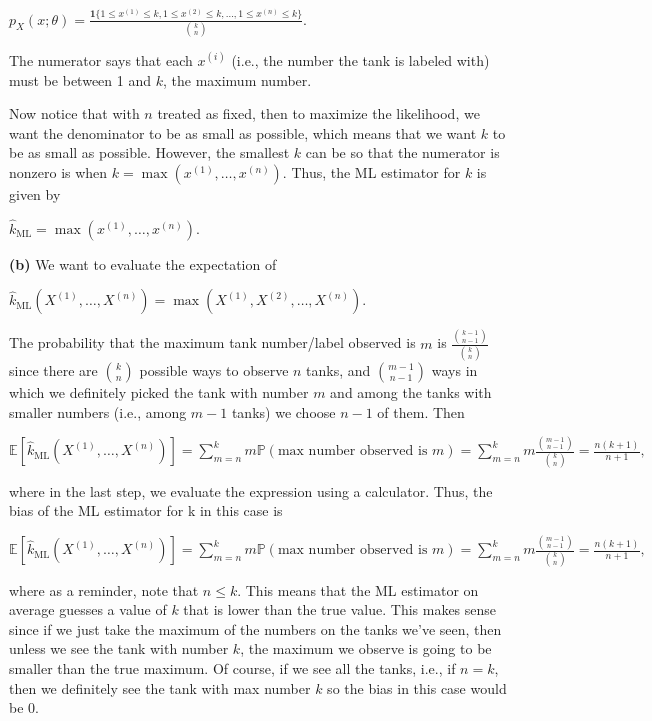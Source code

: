 \documentclass[6008notes.tex]{subfiles}
\begin{document}
{\centering$p_ X(x; \theta ) = \frac{\mathbf{1}\{ 1\le x^{(1)} \le k, 1 \le x^{(2)} \le k, \dots , 1 \le x^{(n)} \le k\} }{{k \choose n}}.$ \par}
 
The numerator says that each $x^{(i)}$ (i.e., the number the tank is labeled with) must be between 1 and $k$, the maximum number.

Now notice that with $n$ treated as fixed, then to maximize the likelihood, we want the denominator to be as small as possible, which means that we want $k$ to be as small as possible. However, the smallest $k$ can be so that the numerator is nonzero is when $k = \max (x^{(1)}, \dots , x^{(n)})$. Thus, the ML estimator for $k$ is given by

{\centering$\widehat{k}_{\text {ML}} = \max (x^{(1)}, \dots , x^{(n)}).$ \par}

\textbf{(b)} We want to evaluate the expectation of

{\centering$\widehat{k}_\text {ML}(X^{(1)},\dots ,X^{(n)}) = \max (X^{(1)},X^{(2)},\dots ,X^{(n)}).$ \par}
 
The probability that the maximum tank number/label observed is $m$ is $\frac{\binom {k-1}{n-1}}{\binom {k}{n}}$ since there are $\binom {k}{n}$ possible ways to observe $n$ tanks, and $\binom {m-1}{n-1}$ ways in which we definitely picked the tank with number $m$ and among the tanks with smaller numbers (i.e., among $m-1$ tanks) we choose $n-1$ of them. Then

{\centering$\mathbb {E}[\widehat{k}_\text {ML}(X^{(1)},\dots ,X^{(n)})] = \sum _{m=n}^{k} m \mathbb {P}(\text {max number observed is }m) = \sum _{m=n}^{k} m \frac{ \binom {m-1}{n-1}}{ \binom {k}{n}} = \frac{n (k+1)}{n+1},$ \par}
 
where in the last step, we evaluate the expression using a calculator. Thus, the bias of the ML estimator for k in this case is

{\centering$\mathbb {E}[\widehat{k}_\text {ML}(X^{(1)},\dots ,X^{(n)})] = \sum _{m=n}^{k} m \mathbb {P}(\text {max number observed is }m) = \sum _{m=n}^{k} m \frac{ \binom {m-1}{n-1}}{ \binom {k}{n}} = \frac{n (k+1)}{n+1},$ \par}
 
where as a reminder, note that $n \le k$. This means that the ML estimator on average guesses a value of $k$ that is lower than the true value. This makes sense since if we just take the maximum of the numbers on the tanks we've seen, then unless we see the tank with number $k$, the maximum we observe is going to be smaller than the true maximum. Of course, if we see all the tanks, i.e., if $n=k$, then we definitely see the tank with max number $k$ so the bias in this case would be 0.
\end{document}
